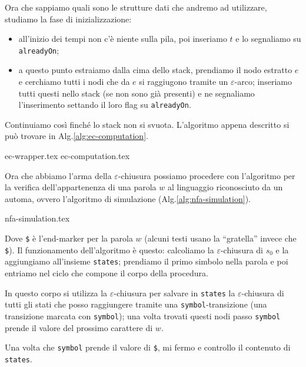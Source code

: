 \documentclass[class=book, crop=false, oneside, 12pt]{standalone}
\begin{document}
Ora che sappiamo quali sono le strutture dati che andremo ad utilizzare, studiamo la fase di inizializzazione: 

\begin{itemize}
    \item all’inizio dei tempi non c’è niente sulla pila, poi inseriamo \(t\) e lo segnaliamo su \texttt{alreadyOn};
    \item a questo punto estraiamo dalla cima dello stack, prendiamo il nodo estratto \(e\) e cerchiamo tutti i nodi che da \(e\) si raggiugono tramite un \(\varepsilon\)-arco; inseriamo tutti questi nello stack (se non sono già presenti) e ne segnaliamo l'inserimento settando il loro flag su \texttt{alreadyOn}.
\end{itemize}

Continuiamo così finché lo stack non si svuota. L'algoritmo appena descritto si può trovare in Alg.\ref{alg:ec-computation}.

	{ec-wrapper.tex}
	{ec-computation.tex}

Ora che abbiamo l'arma della \(\varepsilon\)-chiusura possiamo procedere con l'algoritmo per la verifica dell'appartenenza di una parola \(w\) al linguaggio riconosciuto da un automa, ovvero l'algoritmo di simulazione (Alg.\ref{alg:nfa-simulation}).

{nfa-simulation.tex}

Dove \texttt{\$} è l’end-marker per la parola \(w\) (alcuni testi usano la “gratella” invece che \texttt{\$}).
Il funzionamento dell'algoritmo è questo: calcoliamo la \(\varepsilon\)-chiusura di \(s_0\) e la aggiungiamo all'insieme \texttt{states}; prendiamo il primo simbolo nella parola e poi entriamo nel ciclo che compone il corpo della procedura.

In questo corpo si utilizza la \(\varepsilon\)-chiusura per salvare in \texttt{states} la \(\varepsilon\)-chiusura di tutti gli stati che posso raggiungere tramite una \texttt{symbol}-transizione (una transizione marcata con \texttt{symbol}); una volta trovati questi nodi passo \texttt{symbol} prende il valore del prossimo carattere di \(w\).

Una volta che \texttt{symbol} prende il valore di \texttt{\$}, mi fermo e controllo il contenuto di \texttt{states}.
\end{document}
